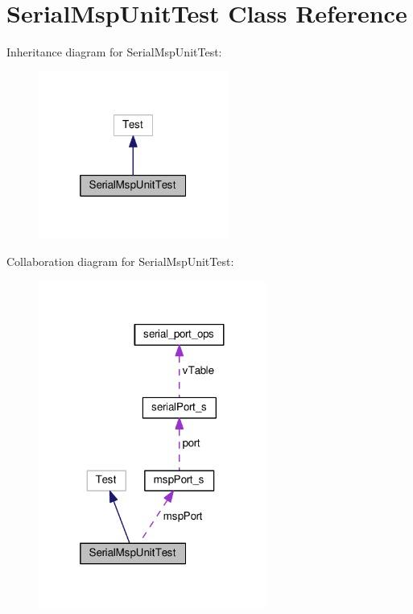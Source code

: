 \hypertarget{classSerialMspUnitTest}{\section{Serial\+Msp\+Unit\+Test Class Reference}
\label{classSerialMspUnitTest}
}


Inheritance diagram for Serial\+Msp\+Unit\+Test\+:\nopagebreak
\begin{figure}[H]
\begin{center}
\leavevmode
\includegraphics[width=176pt]{classSerialMspUnitTest__inherit__graph}
\end{center}
\end{figure}


Collaboration diagram for Serial\+Msp\+Unit\+Test\+:\nopagebreak
\begin{figure}[H]
\begin{center}
\leavevmode
\includegraphics[width=212pt]{classSerialMspUnitTest__coll__graph}
\end{center}
\end{figure}
